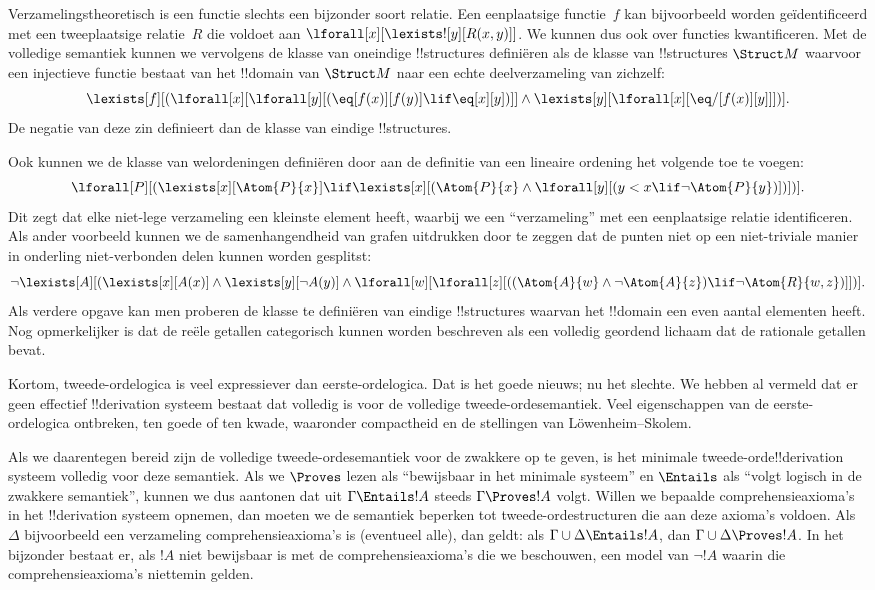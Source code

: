 \documentclass[../../../include/open-logic-section]{subfiles}
\begin{document}
Verzamelingstheoretisch is een functie slechts een bijzonder soort relatie.
Een eenplaatsige functie~$f$ kan bijvoorbeeld worden geïdentificeerd met een
tweeplaatsige relatie~$R$ die voldoet aan
$\lforall[x][\lexists![y][R(x,y)]]$. We kunnen dus ook over functies
kwantificeren. Met de volledige semantiek kunnen we vervolgens de klasse van
oneindige !!{structure}s definiëren als de klasse van !!{structure}s
$\Struct M$ waarvoor een injectieve functie bestaat van het !!{domain} van
$\Struct M$ naar een echte deelverzameling van zichzelf:
\[
\lexists[f][(\lforall[x][\lforall[y][(\eq[f(x)][f(y)] \lif \eq[x][y])]]
  \land \lexists[y][\lforall[x][\eq/[f(x)][y]]])].
\]
De negatie van deze zin definieert dan de klasse van eindige !!{structure}s.

Ook kunnen we de klasse van welordeningen definiëren door aan de definitie
van een lineaire ordening het volgende toe te voegen:
\[
\lforall[P][(\lexists[x][\Atom{P}{x}] \lif \lexists[x][(\Atom{P}{x}
    \land \lforall[y][(y < x \lif \lnot \Atom{P}{y})])])].
\]
Dit zegt dat elke niet-lege verzameling een kleinste element heeft, waarbij
we een ``verzameling'' met een eenplaatsige relatie identificeren. Als ander
voorbeeld kunnen we de samenhangendheid van grafen uitdrukken door te zeggen
dat de punten niet op een niet-triviale manier in onderling niet-verbonden
delen kunnen worden gesplitst:
\[
\lnot \lexists[A][(\lexists[x][A(x)] \land \lexists[y][\lnot A(y)]
  \land \lforall[w][\lforall[z][((\Atom{A}{w} \land \lnot \Atom{A}{z})
      \lif \lnot \Atom{R}{w,z})]])].
\]
Als verdere opgave kan men proberen de klasse te definiëren van eindige
!!{structure}s waarvan het !!{domain} een even aantal elementen heeft. Nog
opmerkelijker is dat de reële getallen categorisch kunnen worden beschreven
als een volledig geordend lichaam dat de rationale getallen bevat.

Kortom, tweede-ordelogica is veel expressiever dan eerste-ordelogica. Dat is
het goede nieuws; nu het slechte. We hebben al vermeld dat er geen effectief
!!{derivation} systeem bestaat dat volledig is voor de volledige
tweede-ordesemantiek. Veel eigenschappen van de eerste-ordelogica ontbreken,
ten goede of ten kwade, waaronder compactheid en de stellingen van
L\"owenheim--Skolem.

Als we daarentegen bereid zijn de volledige tweede-ordesemantiek voor de
zwakkere op te geven, is het minimale tweede-orde!!{derivation} systeem
volledig voor deze semantiek. Als we $\Proves$ lezen als ``bewijsbaar in het
minimale systeem'' en $\Entails$ als ``volgt logisch in de zwakkere
semantiek'', kunnen we dus aantonen dat uit $\Gamma \Entails !A$ steeds
$\Gamma \Proves !A$ volgt. Willen we bepaalde comprehensieaxioma's in het
!!{derivation} systeem opnemen, dan moeten we de semantiek beperken tot
tweede-ordestructuren die aan deze axioma's voldoen. Als $\Delta$
bijvoorbeeld een verzameling comprehensieaxioma's is (eventueel alle), dan
geldt: als $\Gamma \cup \Delta \Entails !A$, dan
$\Gamma \cup \Delta \Proves !A$. In het bijzonder bestaat er, als $!A$ niet
bewijsbaar is met de comprehensieaxioma's die we beschouwen, een model van
$\lnot !A$ waarin die comprehensieaxioma's niettemin gelden.
\end{document}
